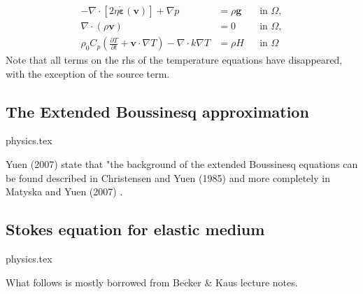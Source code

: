 \begin{align}
  \label{eq:stokes-1}
  -\nabla \cdot \left[2\eta \dot{\bm \varepsilon}(\bm v)
                \right] + \nabla p &=
  \rho \bm g
  &
  & \textrm{in $\Omega$},
  \\
  \label{eq:stokes-2}
  \nabla \cdot (\rho \bm v) &= 0
  &
  & \textrm{in $\Omega$},
  \\
  \label{eq:temperature}
  \rho_0 C_p \left(\frac{\partial T}{\partial t} + \bm v\cdot\nabla T\right)
  - \nabla\cdot k\nabla T
  &=
  \rho H
  &
  & \textrm{in $\Omega$}
\end{align}
Note that all terms on the rhs of the temperature equations have disappeared, with the exception 
of the source term.


\subsection{The Extended Boussinesq approximation}
\begin{flushright} {\tiny {\color{gray} physics.tex}} \end{flushright}


Yuen \etal (2007) \cite{yumc07} state that "the background of the extended Boussinesq 
equations can be found described in 
Christensen and Yuen (1985) \cite{chyu85} and more completely in Matyska and Yuen (2007) \cite{mayu07}.

\Literature \cite{hayk91,hayk93}




\newpage
\subsection{Stokes equation for elastic medium}
\begin{flushright} {\tiny {\color{gray} physics.tex}} \end{flushright}

What follows is mostly borrowed from Becker \& Kaus lecture notes.


